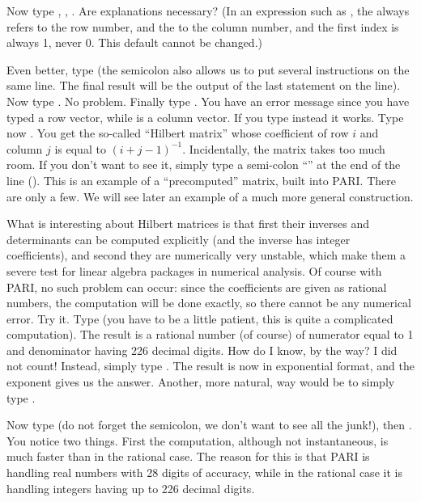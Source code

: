 Now type , , . Are explanations necessary?
(In an expression such as , the  always refers to the
row number, and the  to the column number, and the first index is
always 1, never 0. This default cannot be changed.)

Even better, type  (the semicolon also allows us to put
several instructions on the same line. The final result will be the output of
the last statement on the line). Now type . No
problem. Finally type . You have an error message since you
have typed a row vector, while  is a column vector. If you type
instead  it works. \smallskip
%
Type now . You get the so-called ``Hilbert matrix''
whose coefficient of row $i$ and column $j$ is equal to $(i+j-1)^{-1}$.
Incidentally, the matrix  takes too much room. If you don't want to
see it, simply type a semi-colon ``\kbd{;}'' at the end of the line
(). This is an example of a ``precomputed'' matrix,
built into PARI. There are only a few. We will see later an example of a much
more general construction.

What is interesting about Hilbert matrices is that first their inverses and
determinants can be computed explicitly (and the inverse has integer
coefficients), and second they are numerically very unstable, which make them
a severe test for linear algebra packages in numerical analysis.  Of course
with PARI, no such problem can occur: since the coefficients are given as
rational numbers, the computation will be done exactly, so there cannot be
any numerical error. Try it. Type  (you have to be a
little patient, this is quite a complicated computation). The result is a
rational number (of course) of numerator equal to 1 and denominator having
226 decimal digits. How do I know, by the way? I did not count! Instead,
simply type . The result is now in exponential format, and the
exponent gives us the answer. Another, more natural, way would be to simply
type .

Now type  (do not forget the semicolon, we don't want to see
all the junk!), then . You notice two things. First the
computation, although not instantaneous, is much faster than in the rational
case. The reason for this is that PARI is handling real numbers with 28
digits of accuracy, while in the rational case it is handling integers having
up to 226 decimal digits.

